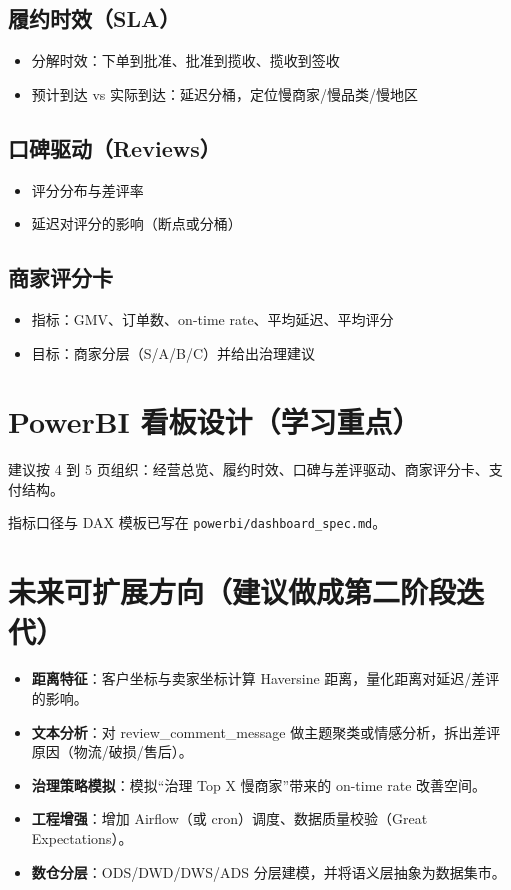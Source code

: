 \documentclass[UTF8,11pt]{ctexart}
\begin{document}
\subsection{履约时效（SLA）}
\begin{itemize}
  \item 分解时效：下单到批准、批准到揽收、揽收到签收
  \item 预计到达 vs 实际到达：延迟分桶，定位慢商家/慢品类/慢地区
\end{itemize}

\subsection{口碑驱动（Reviews）}
\begin{itemize}
  \item 评分分布与差评率
  \item 延迟对评分的影响（断点或分桶）
\end{itemize}

\subsection{商家评分卡}
\begin{itemize}
  \item 指标：GMV、订单数、on-time rate、平均延迟、平均评分
  \item 目标：商家分层（S/A/B/C）并给出治理建议
\end{itemize}

\section{PowerBI 看板设计（学习重点）}
建议按 4 到 5 页组织：经营总览、履约时效、口碑与差评驱动、商家评分卡、支付结构。

指标口径与 DAX 模板已写在 \texttt{powerbi/dashboard\_spec.md}。

\section{未来可扩展方向（建议做成第二阶段迭代）}
\begin{itemize}
  \item \textbf{距离特征}：客户坐标与卖家坐标计算 Haversine 距离，量化距离对延迟/差评的影响。
  \item \textbf{文本分析}：对 review\_comment\_message 做主题聚类或情感分析，拆出差评原因（物流/破损/售后）。
  \item \textbf{治理策略模拟}：模拟“治理 Top X 慢商家”带来的 on-time rate 改善空间。
  \item \textbf{工程增强}：增加 Airflow（或 cron）调度、数据质量校验（Great Expectations）。
  \item \textbf{数仓分层}：ODS/DWD/DWS/ADS 分层建模，并将语义层抽象为数据集市。
\end{itemize}
\end{document}
